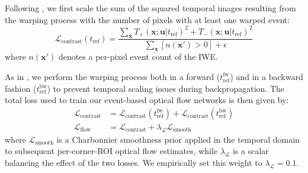 Following \cite{hagenaars2021selfsupervised}, we first scale the sum of the squared temporal images resulting from the warping process with the number of pixels with at least one warped event:
\begin{equation}\label{eq:sr_scaling}
    \mathcal{L}_{\text{contrast}}(t_{\text{ref}}) = \frac{\sum_{\boldsymbol{x}} T_{+}(\boldsymbol{x}{;}\boldsymbol{u} |t_{\text{ref}})^2 + T_{-}(\boldsymbol{x}{;}\boldsymbol{u} |t_{\text{ref}})^2}{\sum_{\boldsymbol{x}}\left[n(\boldsymbol{x}') > 0\right] + \epsilon}
\end{equation}
where $n(\boldsymbol{x}')$ denotes a per-pixel event count of the IWE.

As in \cite{zhu2019unsupervised,paredes-valles2021back, hagenaars2021selfsupervised}, we perform the warping process both in a forward ($t_{\text{ref}}^{\text{fw}}$) and in a backward fashion ($t_{\text{ref}}^{\text{bw}}$) to prevent temporal scaling issues during backpropagation. The total loss used to train our event-based optical flow networks is then given by:
\begin{align}\label{eq:sr_flow_loss}
\mathcal{L}_{\text{contrast}} &= \mathcal{L}_{\text{contrast}}(t_{\text{ref}}^{\text{fw}}) + \mathcal{L}_{\text{contrast}}(t_{\text{ref}}^{\text{bw}})\\
\mathcal{L}_{\text{flow}} &= \mathcal{L}_{\text{contrast}} + \lambda_{\mathcal{L}} \mathcal{L}_{\text{smooth}}\label{eq:sr_final_loss}
\end{align}
where $\mathcal{L}_{\text{smooth}}$ is a Charbonnier smoothness prior \cite{charbonnier1994two} applied in the temporal domain to subsequent per-corner-ROI optical flow estimates, while $\lambda_{\mathcal{L}}$ is a scalar balancing the effect of the two losses. We empirically set this weight to $\lambda_{\mathcal{L}}=0.1$.

